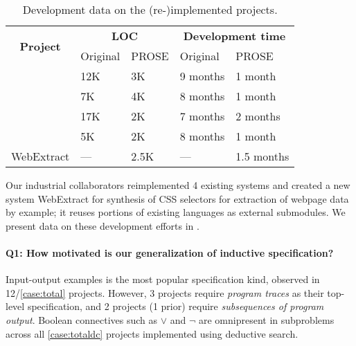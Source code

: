 \begin{table}
    \centering
    \begin{tabular}{lllll}
        \toprule
        \multicolumn{1}{c}{\multirow{2}{*}{\textbf{Project}}} & \multicolumn{2}{c}{\textbf{LOC}} & \multicolumn{2}{c}{\textbf{Development time}} \\
        \cmidrule{2-3}  \cmidrule{4-5}
        & Original & PROSE & Original & PROSE \\
        \midrule
        \citet{flashfill} & 12K & 3K & 9 months & 1 month \\
        \citet{flashextract} & 7K & 4K & 8 months & 1 month \\
        \citet{flashnormalize} & 17K & 2K & 7 months & 2 months \\
        \citet{flashrelate} & 5K & 2K & 8 months & 1 month \\
        \textsf{WebExtract} & --- & 2.5K & --- & 1.5 months \\
        \bottomrule
    \end{tabular}
    \caption{Development data on the (re-)implemented projects.}
    \label{tbl:prose:reimplementation}
\end{table}

Our industrial collaborators reimplemented 4 existing systems
and created a new system \textsf{WebExtract} for synthesis of CSS selectors for extraction of webpage data by example;
it reuses portions of existing languages as external submodules.
We present data on these development efforts in .

\paragraph{Q1: How motivated is our generalization of inductive specification?}
Input-output examples is the most popular specification kind, observed in 12/\ref*{case:total} projects.
However, 3 projects require \emph{program traces} as their top-level specification, and 2 projects (1 prior) require
\emph{subsequences of program output}.
Boolean connectives such as $\vee$ and $\neg$ are omnipresent in subproblems across all \ref*{case:totaldc} projects
implemented using deductive search.

